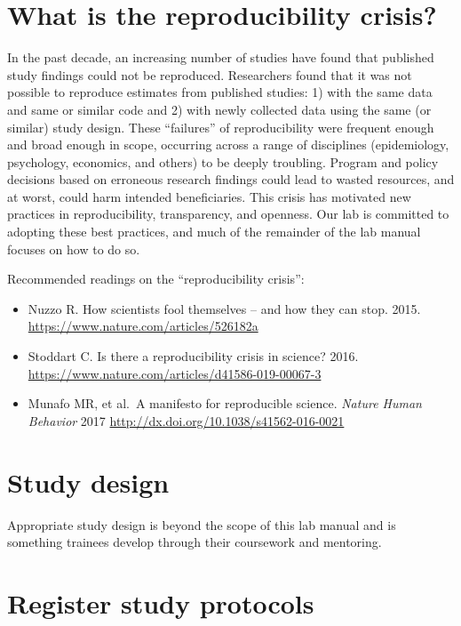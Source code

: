 \documentclass[
]{book}
\begin{document}
\section{What is the reproducibility crisis?}\label{what-is-the-reproducibility-crisis}

In the past decade, an increasing number of studies have found that published study findings could not be reproduced. Researchers found that it was not possible to reproduce estimates from published studies: 1) with the same data and same or similar code and 2) with newly collected data using the same (or similar) study design. These ``failures'' of reproducibility were frequent enough and broad enough in scope, occurring across a range of disciplines (epidemiology, psychology, economics, and others) to be deeply troubling. Program and policy decisions based on erroneous research findings could lead to wasted resources, and at worst, could harm intended beneficiaries. This crisis has motivated new practices in reproducibility, transparency, and openness. Our lab is committed to adopting these best practices, and much of the remainder of the lab manual focuses on how to do so.

Recommended readings on the ``reproducibility crisis'':

\begin{itemize}
\item
  Nuzzo R. How scientists fool themselves -- and how they can stop. 2015. \href{}{https://www.nature.com/articles/526182a}
\item
  Stoddart C. Is there a reproducibility crisis in science? 2016. \url{https://www.nature.com/articles/d41586-019-00067-3}
\item
  Munafo MR, et al.~A manifesto for reproducible science. \emph{Nature Human Behavior} 2017 \url{http://dx.doi.org/10.1038/s41562-016-0021}
\end{itemize}

\section{Study design}\label{study-design}

Appropriate study design is beyond the scope of this lab manual and is something trainees develop through their coursework and mentoring.

\section{Register study protocols}\label{register-study-protocols}
\end{document}
